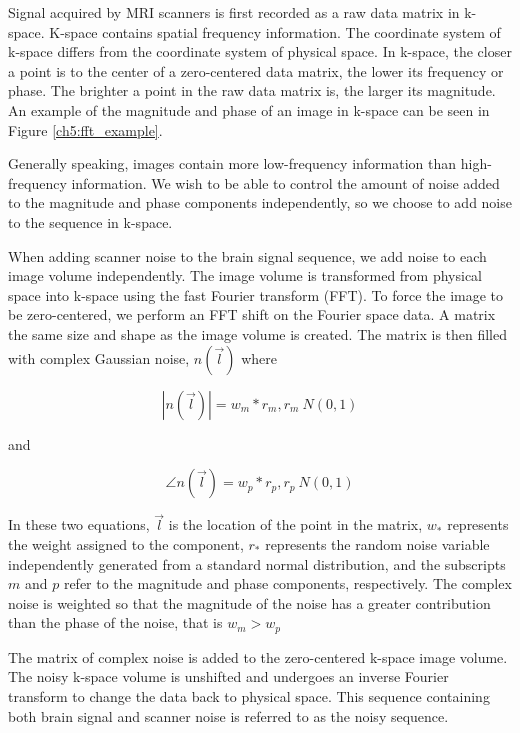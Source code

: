 Signal acquired by MRI scanners is first recorded as a raw data matrix in k-space. K-space contains spatial frequency information. The coordinate system of k-space differs from the coordinate system of physical space. In k-space, the closer a point is to the center of a zero-centered data matrix, the lower its frequency or phase. The brighter a point in the raw data matrix is, the larger its magnitude. An example of the magnitude and phase of an image in k-space can be seen in Figure \ref{ch5:fft_example}.

Generally speaking, images contain more low-frequency information than high-frequency information. We wish to be able to control the amount of noise added to the magnitude and phase components independently, so we choose to add noise to the sequence in k-space.

When adding scanner noise to the brain signal sequence, we add noise to each image volume independently. The image volume is transformed from physical space into k-space using the fast Fourier transform (FFT). To force the image to be zero-centered, we perform an FFT shift on the Fourier space data. A matrix the same size and shape as the image volume is created. The matrix is then filled with complex Gaussian noise, $n(\vec{l})$ where

\begin{equation}
|n(\vec{l})| = w_m * r_m, r_m~N(0,1)
\end{equation}

\noindent and

\begin{equation}
\angle n(\vec{l}) = w_p * r_p, r_p~N(0,1)
\end{equation}

\noindent In these two equations, $\vec{l}$ is the location of the point in the matrix, $w_*$ represents the weight assigned to the component, $r_*$ represents the random noise variable independently generated from a standard normal distribution, and the subscripts $m$ and $p$ refer to the magnitude and phase components, respectively. The complex noise is weighted so that the magnitude of the noise has a greater contribution than the phase of the noise, that is $w_m > w_p$ 

The matrix of complex noise is added to the zero-centered k-space image volume. The noisy k-space volume is unshifted and undergoes an inverse Fourier transform to change the data back to physical space. This sequence containing both brain signal and scanner noise is referred to as the noisy sequence.

